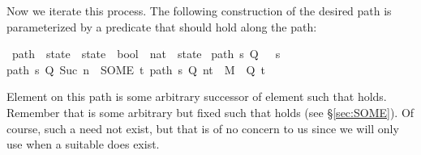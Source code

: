 \begin{isabellebody}
\begin{isamarkuptext}
Now we iterate this process. The following construction of the desired
path is parameterized by a predicate  that should hold along the path:%
\end{isamarkuptext}%
\isamarkuptrue%
\isamarkupfalse%
\ path\ {}{}\ {}state\ {}\ {}state\ {}\ bool{}\ {}\ {}nat\ {}\ state{}{}\ \isanewline
{}path\ s\ Q\ {}\ {}\ s{}\ {}\isanewline
{}path\ s\ Q\ {}Suc\ n{}\ {}\ {}SOME\ t{}\ {}path\ s\ Q\ n{}t{}\ {}\ M\ {}\ Q\ t{}{}%
\begin{isamarkuptext}%
\noindent
Element  on this path is some arbitrary successor
 of element  such that  holds.  Remember that 
is some arbitrary but fixed  such that  holds (see \S\ref{sec:SOME}). Of
course, such a  need not exist, but that is of no
concern to us since we will only use  when a
suitable  does exist.


\end{isamarkuptext}
\end{isabellebody}
